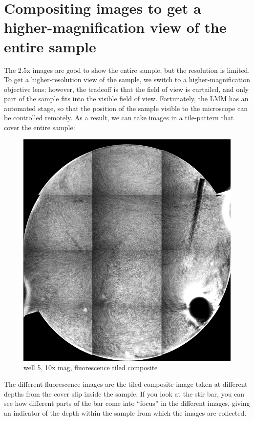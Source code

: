 \section{Compositing images to get a higher-magnification view of the entire sample}\label{compositing-images-to-get-a-higher-magnification-view-of-the-entire-sample}
The 2.5x images are good to show the entire sample, but the resolution is
limited. To get a higher-resolution view of the sample, we switch to a
higher-magnification objective lens; however, the tradeoff is that the field of
view is curtailed, and only part of the sample fits into the visible field of
view. Fortunately, the LMM has an automated stage, so that the position of the
sample visible to the microscope can be controlled remotely. As a result, we can
take images in a tile-pattern that cover the entire sample:

\begin{figure}
\begin{center}
\includegraphics[width=\columnwidth]{./images/2014_06_04_first_day/140604_well5_composite}
\caption{well 5, 10x mag, fluorescence tiled composite}
\end{center}
\end{figure}

The different fluorescence images are the tiled composite image taken at
different depths from the cover slip inside the sample. If you look at the stir
bar, you can see how different parts of the bar come into ``focus'' in the
different images, giving an indicator of the depth within the sample from which
the images are collected.

